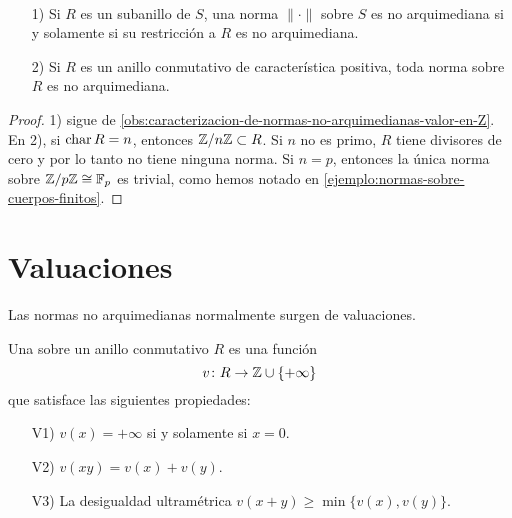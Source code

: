 \documentclass{article}
\numberwithin{equation}{section}
\theoremstyle{definition}
\begin{document}
\begin{corolario}
  \label{corr:caracterizacion-de-normas-no-arquimedianas}
  ~

  \begin{enumerate}
  \item[1)] Si $R$ es un subanillo de $S$, una norma $\|\cdot\|$ sobre $S$ es no
    arquimediana si y solamente si su restricción a $R$ es no arquimediana.

  \item[2)] Si $R$ es un anillo conmutativo de característica positiva, toda
    norma sobre $R$ es no arquimediana.
  \end{enumerate}

  \begin{proof}
    1) sigue de
    \ref{obs:caracterizacion-de-normas-no-arquimedianas-valor-en-Z}. En 2), si
    $\operatorname{char} R = n$, entonces $\mathbb{Z}/n\mathbb{Z} \subset R$. Si $n$ no es primo, $R$ tiene
    divisores de cero y por lo tanto no tiene ninguna norma. Si $n = p$,
    entonces la única norma sobre $\mathbb{Z}/p\mathbb{Z} \cong \mathbb{F}_p$ es trivial, como hemos
    notado en \ref{ejemplo:normas-sobre-cuerpos-finitos}.
  \end{proof}
\end{corolario}


\section{Valuaciones}

Las normas no arquimedianas normalmente surgen de valuaciones.

\begin{definicion}
  \label{dfn:valuaciones}
  Una  sobre un anillo conmutativo $R$ es una función
  $$v\colon R \to \mathbb{Z} \cup \{ +\infty \}$$
  que satisface las siguientes propiedades:

  \begin{enumerate}
  \item[V1)] $v (x) = +\infty$ si y solamente si $x = 0$.

  \item[V2)] $v (xy) = v (x) + v (y)$.

  \item[V3)] La desigualdad ultramétrica $v (x + y) \ge \min \{ v (x), v (y) \}$.
  \end{enumerate}
\end{definicion}
\end{document}
